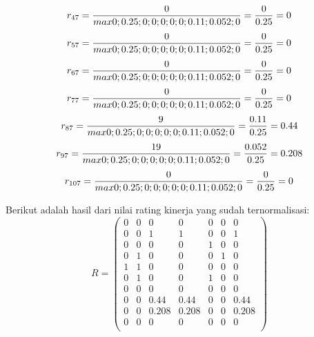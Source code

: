 \documentclass[a4paper,twoside]{article}
\begin{document}
\begin{enumerate}
\begin{enumerate}
\begin{displaymath}
r_{47} = \frac{0}{max {0;0.25;0;0;0;0;0;0.11;0.052;0}} = \frac{0}{0.25} = 0\\
\end {displaymath}
\begin{displaymath}
r_{57} = \frac{0}{max {0;0.25;0;0;0;0;0;0.11;0.052;0}} = \frac{0}{0.25} = 0\\
\end {displaymath}
\begin{displaymath}
r_{67} = \frac{0}{max {0;0.25;0;0;0;0;0;0.11;0.052;0}} = \frac{0}{0.25} = 0\\
\end {displaymath}
\begin{displaymath}
r_{77} = \frac{0}{max {0;0.25;0;0;0;0;0;0.11;0.052;0}} = \frac{0}{0.25} = 0\\
\end {displaymath}
\begin{displaymath}
r_{87} = \frac{9}{max {0;0.25;0;0;0;0;0;0.11;0.052;0}} = \frac{0.11}{0.25} = 0.44\\
\end {displaymath}
\begin{displaymath}
r_{97} = \frac{19}{max {0;0.25;0;0;0;0;0;0.11;0.052;0}} = \frac{0.052}{0.25} = 0.208\\
\end {displaymath}
\begin{displaymath}
r_{107} = \frac{0}{max {0;0.25;0;0;0;0;0;0.11;0.052;0}} = \frac{0}{0.25} = 0\\
\end {displaymath}
\end{enumerate}

Berikut adalah hasil dari nilai rating kinerja yang sudah ternormalisasi:
\begin{displaymath} R = 
\left (
\begin{array}{rrrrrrr}
0 & 0 & 0 & 0 & 0 & 0 & 0\\		
0 & 0 & 1 & 1 & 0 & 0 & 1\\
0 & 0 & 0 & 0 & 1 & 0 & 0\\
0 & 1 & 0 & 0 & 0 & 1 & 0\\
1 & 1 & 0 & 0 & 0 & 0 & 0\\
0 & 1 & 0 & 0 & 1 & 0 & 0\\
0 & 0 & 0 & 0 & 0 & 0 & 0\\
0 & 0 & 0.44 & 0.44 & 0 & 0 & 0.44\\
0 & 0 & 0.208 & 0.208 & 0 & 0 & 0.208\\
0 & 0 & 0 & 0 & 0 & 0 & 0\\
			\end{array}\right )	
	\end{displaymath}



\end{enumerate}
\end{document}

